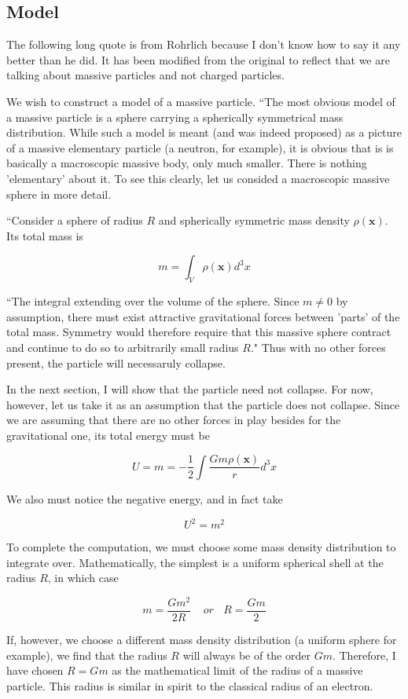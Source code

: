 \documentclass {article}
\renewcommand\vec{\mathbf}
\begin{document}
\newpage
\subsection{Model}
The following long quote is from Rohrlich because I don't know how to say it any better than he did. It has been modified from the original to reflect that we are talking about massive particles and not charged particles.

We wish to construct a model of a massive particle. ``The most obvious model of a massive particle is a sphere carrying a spherically symmetrical mass distribution. While such a model is meant (and was indeed proposed) as a picture of a massive elementary particle (a neutron, for example), it is obvious that is is basically a macroscopic massive body, only much smaller. There is nothing 'elementary' about it. To see this clearly, let us consided a macroscopic massive sphere in more detail.

``Consider a sphere of radius $R$ and spherically symmetric mass density $\rho (\vec x)$. Its total mass is

$$ m = \int_V \rho(\vec x) d^3x$$

``The integral extending over the volume of the sphere. Since $m \neq 0$ by assumption, there must exist attractive gravitational forces between 'parts' of the total mass. Symmetry would therefore require that this massive sphere contract and continue to do so to arbitrarily small radius $R$." Thus with no other forces present, the particle will necessaruly collapse.

In the next section, I will show that the particle need not collapse. For now, however, let us take it as an assumption that the particle does not collapse. Since we are assuming that there are no other forces in play besides for the gravitational one, its total energy must be

$$U = m = - \frac 1 2 \int \frac {Gm \rho(\vec x)} {r} d^3x$$

We also must notice the negative energy, and in fact take 

$$U^2 = m^2$$

To complete the computation, we must choose some mass density distribution to integrate over. Mathematically, the simplest is a uniform spherical shell at the radius $R$, in which case

$$m = \frac {Gm^2} { 2R} ~~~~~ or  ~~~~ R = \frac {Gm} 2 $$

If, however, we choose a different mass density distribution (a uniform sphere for example), we find that the radius $R$ will always be of the order $Gm$. Therefore, I have chosen $R = Gm$ as the mathematical limit of the radius of a massive particle. This radius is similar in spirit to the classical radius of an electron.
\end{document}
